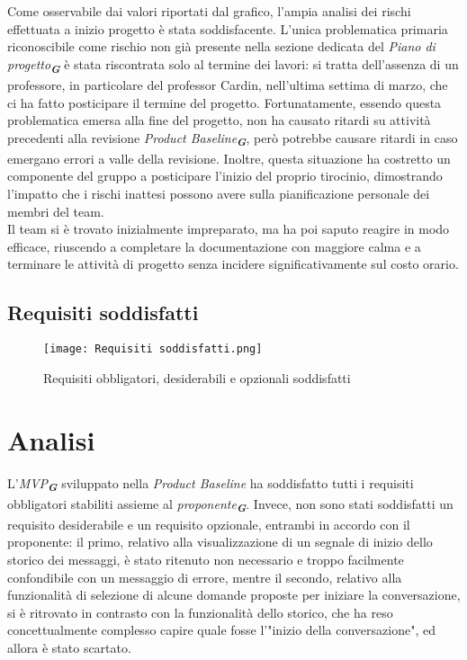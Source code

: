 Come osservabile dai valori riportati dal grafico, l’ampia analisi dei rischi effettuata a inizio progetto è stata soddisfacente. 
L'unica problematica primaria riconoscibile come rischio non già presente nella sezione dedicata del \emph{Piano di progetto}\textsubscript{\textbf{\textit{G}}} è stata riscontrata solo al termine dei lavori: 
si tratta dell'assenza di un professore, in particolare del professor Cardin, nell'ultima settima di marzo, che ci ha fatto posticipare il termine del progetto. 
Fortunatamente, essendo questa problematica emersa alla fine del progetto, non ha causato ritardi su attività precedenti alla revisione \emph{Product Baseline}\textsubscript{\textbf{\textit{G}}}, 
però potrebbe causare ritardi in caso emergano errori a valle della revisione.
Inoltre, questa situazione ha costretto un componente del gruppo a posticipare l'inizio del proprio tirocinio, dimostrando l'impatto che i rischi inattesi possono avere sulla pianificazione personale dei membri del team.\\
Il team si è trovato inizialmente impreparato, ma ha poi saputo reagire in modo efficace, 
riuscendo a completare la documentazione con maggiore calma e a terminare le attività di progetto 
senza incidere significativamente sul costo orario.



\newpage

\subsection{Requisiti soddisfatti}
\label{subsec:Requisiti soddisfatti}

\begin{figure}[h] 
    \centering
    \texttt{[image: Requisiti soddisfatti.png]}
    \caption{Requisiti obbligatori, desiderabili e opzionali soddisfatti} 
    \label{fig: Requisiti soddisfatti}
\end{figure}

\section*{Analisi}
L'\emph{MVP}\textsubscript{\textbf{\textit{G}}} sviluppato nella \emph{Product Baseline} ha soddisfatto tutti i requisiti obbligatori stabiliti assieme al \emph{proponente}\textsubscript{\textbf{\textit{G}}}. Invece, non sono stati soddisfatti un requisito desiderabile e un requisito opzionale, entrambi in accordo con il proponente: il primo, relativo alla visualizzazione di un segnale di inizio dello storico dei messaggi, è stato ritenuto non necessario e troppo facilmente confondibile con un messaggio di errore, mentre il secondo, relativo alla funzionalità di selezione di alcune domande proposte per iniziare la conversazione, si è ritrovato in contrasto con la funzionalità dello storico, che ha reso concettualmente complesso capire quale fosse l'"inizio della conversazione", ed allora è stato scartato.

